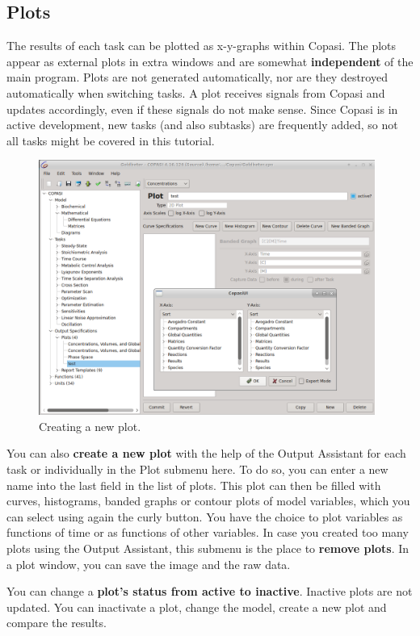\documentclass[a4paper,11pt,twoside]{article}
\begin{document}
\subsection{Plots}
\label{sub:Plots}
The results of each task can be plotted as x-y-graphs within Copasi. The plots appear as external plots in extra windows and are somewhat \textbf{independent} of the main program. Plots are not generated automatically, nor are they destroyed automatically when switching tasks. A plot receives signals from Copasi and updates accordingly, even if these signals do not make sense.
Since Copasi is in active development, new tasks (and also subtasks) are frequently added, so not all tasks might be covered in this tutorial.
\begin{figure}[t!]
 \centering
 \includegraphics[width=11cm]{Pictures/Bildschirmfoto_2016-11-10_11-08-42.png}
 \caption{\footnotesize Creating a new plot.}
 \label{fig:Plot}
\end{figure}
You can also \textbf{create a new plot} with the help of the Output Assistant for each task or individually in the Plot submenu here. To do so, you can enter a new name into the last field in the list of plots. This plot can then be filled with curves, histograms, banded graphs or contour plots of model variables, which you can select using again the curly button. You have the choice to plot variables as functions of time or as functions of other variables. In case you created too many plots using the Output Assistant, this submenu is the place to \textbf{remove plots}. In a plot window, you can save the image and the raw data.

You can change a \textbf{plot's status from active to inactive}. Inactive plots are not updated. You can inactivate a plot, change the model, create a new plot and compare the results.
\end{document}
